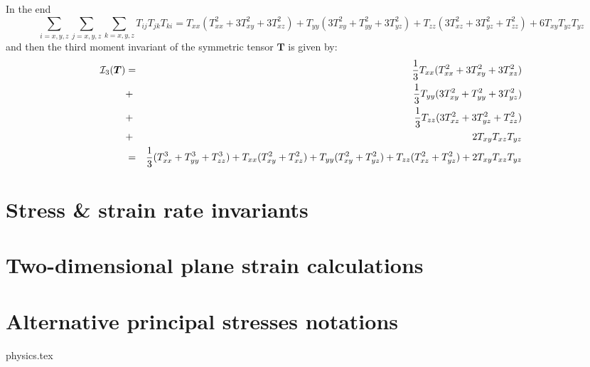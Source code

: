 In the end 
\[
\sum_{i=x,y,z} \sum_{j=x,y,z} \sum_{k=x,y,z}
T_{ij}T_{jk}T_{ki}
= T_{xx}( T_{xx}^2 + 3T_{xy}^2 + 3T_{xz}^2)
+ T_{yy}(3T_{xy}^2 +  T_{yy}^2 + 3T_{yz}^2   )
+ T_{zz}(3T_{xz}^2 + 3T_{yz}^2 + T_{zz}^2  )
+6T_{xy}T_{yz}T_{yz}
\]
and then the third moment invariant of the symmetric tensor ${\bm T}$
is given by:
\begin{eqnarray}
{\cal I}_3({\bm T}) 
&=& \frac{1}{3} T_{xx} (  T_{xx}^2 + 3 T_{xy}^2 + 3 T_{xz}^2  )     \nonumber\\
&+& \frac{1}{3} T_{yy} (3 T_{xy}^2 +   T_{yy}^2 + 3 T_{yz}^2  )     \nonumber\\
&+& \frac{1}{3} T_{zz} (3 T_{xz}^2 + 3 T_{yz}^2 +   T_{zz}^2)       \nonumber\\
&+& 2 T_{xy} T_{xz} T_{yz} \\
&=& \frac{1}{3} (T_{xx}^3+T_{yy}^3+T_{zz}^3) 
+T_{xx} ( T_{xy}^2 +  T_{xz}^2  ) 
+T_{yy} ( T_{xy}^2 +  T_{yz}^2  ) 
+T_{zz} ( T_{xz}^2 +  T_{yz}^2  ) + 2 T_{xy} T_{xz} T_{yz} 
\end{eqnarray}




\section{Stress \& strain rate invariants}\label{sec:stress_invariants}



\section{Two-dimensional plane strain calculations \label{ss:plane_strain}} 










\section{Alternative principal stresses notations}\label{sec:altinv}
\begin{flushright} {\tiny {\color{gray} physics.tex}} \end{flushright}

